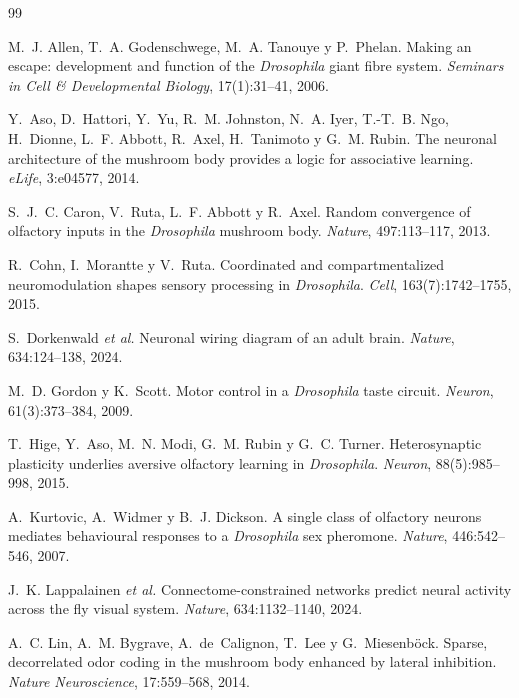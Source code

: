 \documentclass[11pt,a4paper]{article}
\theoremstyle{plain}
\theoremstyle{definition}
\theoremstyle{remark}
\begin{document}
\begin{thebibliography}{99}
\small

M.~J. Allen, T.~A. Godenschwege, M.~A. Tanouye y P.~Phelan.
\newblock Making an escape: development and function of the \textit{Drosophila}
  giant fibre system.
\newblock \emph{Seminars in Cell \& Developmental Biology}, 17(1):31--41, 2006.

Y.~Aso, D.~Hattori, Y.~Yu, R.~M. Johnston, N.~A. Iyer, T.-T.~B. Ngo, H.~Dionne,
  L.~F. Abbott, R.~Axel, H.~Tanimoto y G.~M. Rubin.
\newblock The neuronal architecture of the mushroom body provides a logic for
  associative learning.
\newblock \emph{eLife}, 3:e04577, 2014.

S.~J.~C. Caron, V.~Ruta, L.~F. Abbott y R.~Axel.
\newblock Random convergence of olfactory inputs in the \textit{Drosophila}
  mushroom body.
\newblock \emph{Nature}, 497:113--117, 2013.

R.~Cohn, I.~Morantte y V.~Ruta.
\newblock Coordinated and compartmentalized neuromodulation shapes sensory
  processing in \textit{Drosophila}.
\newblock \emph{Cell}, 163(7):1742--1755, 2015.

S.~Dorkenwald \emph{et al.}
\newblock Neuronal wiring diagram of an adult brain.
\newblock \emph{Nature}, 634:124--138, 2024.

M.~D. Gordon y K.~Scott.
\newblock Motor control in a \textit{Drosophila} taste circuit.
\newblock \emph{Neuron}, 61(3):373--384, 2009.

T.~Hige, Y.~Aso, M.~N. Modi, G.~M. Rubin y G.~C. Turner.
\newblock Heterosynaptic plasticity underlies aversive olfactory learning in
  \textit{Drosophila}.
\newblock \emph{Neuron}, 88(5):985--998, 2015.

A.~Kurtovic, A.~Widmer y B.~J. Dickson.
\newblock A single class of olfactory neurons mediates behavioural responses to
  a \textit{Drosophila} sex pheromone.
\newblock \emph{Nature}, 446:542--546, 2007.

J.~K. Lappalainen \emph{et al.}
\newblock Connectome-constrained networks predict neural activity across the
  fly visual system.
\newblock \emph{Nature}, 634:1132--1140, 2024.

A.~C. Lin, A.~M. Bygrave, A.~de~Calignon, T.~Lee y G.~Miesenb\"ock.
\newblock Sparse, decorrelated odor coding in the mushroom body enhanced by
  lateral inhibition.
\newblock \emph{Nature Neuroscience}, 17:559--568, 2014.


\end{thebibliography}
\end{document}
